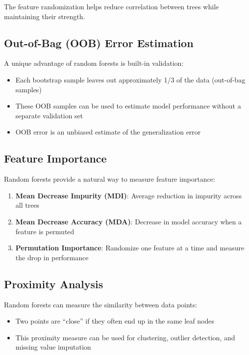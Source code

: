 \documentclass[
  letterpaper,
  DIV=11,
  numbers=noendperiod]{scrreprt}
\providecommand{\tightlist}{%
  \setlength{\itemsep}{0pt}\setlength{\parskip}{0pt}}\usepackage{longtable,booktabs,array}
\begin{document}
The feature randomization helps reduce correlation between trees while
maintaining their strength.

\subsection{Out-of-Bag (OOB) Error
Estimation}\label{out-of-bag-oob-error-estimation}

A unique advantage of random forests is built-in validation:

\begin{itemize}
\tightlist
\item
  Each bootstrap sample leaves out approximately 1/3 of the data
  (out-of-bag samples)
\item
  These OOB samples can be used to estimate model performance without a
  separate validation set
\item
  OOB error is an unbiased estimate of the generalization error
\end{itemize}

\subsection{Feature Importance}\label{feature-importance}

Random forests provide a natural way to measure feature importance:

\begin{enumerate}
\def\labelenumi{\arabic{enumi}.}
\tightlist
\item
  \textbf{Mean Decrease Impurity (MDI)}: Average reduction in impurity
  across all trees
\item
  \textbf{Mean Decrease Accuracy (MDA)}: Decrease in model accuracy when
  a feature is permuted
\item
  \textbf{Permutation Importance}: Randomize one feature at a time and
  measure the drop in performance
\end{enumerate}

\subsection{Proximity Analysis}\label{proximity-analysis}

Random forests can measure the similarity between data points:

\begin{itemize}
\tightlist
\item
  Two points are ``close'' if they often end up in the same leaf nodes
\item
  This proximity measure can be used for clustering, outlier detection,
  and missing value imputation
\end{itemize}
\end{document}
